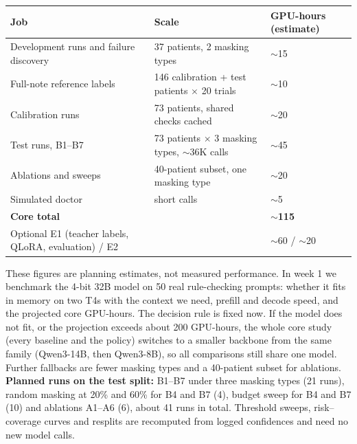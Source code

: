 \documentclass[10pt,a4paper]{article}
\begin{document}
\begin{table}[H]
\centering\footnotesize
\begin{tabularx}{\textwidth}{@{}P{5.2cm}LP{2.0cm}@{}}
\toprule
\textbf{Job} & \textbf{Scale} & \textbf{GPU-hours (estimate)}\\
\midrule
Development runs and failure discovery & 37 patients, 2 masking types & \(\sim\)15\\
Full-note reference labels & 146 calibration + test patients \(\times\) 20 trials & \(\sim\)10\\
Calibration runs & 73 patients, shared checks cached & \(\sim\)20\\
Test runs, B1--B7 & 73 patients \(\times\) 3 masking types, \(\sim\)36K calls & \(\sim\)45\\
Ablations and sweeps & 40-patient subset, one masking type & \(\sim\)20\\
Simulated doctor & short calls & \(\sim\)5\\
\midrule
\textbf{Core total} & & \(\sim\)\textbf{115}\\
Optional E1 (teacher labels, QLoRA, evaluation) / E2 & & \(\sim\)60 / \(\sim\)20\\
\bottomrule
\end{tabularx}
\end{table}
\vspace{-3pt}
These figures are planning estimates, not measured performance. In week 1 we benchmark the 4-bit 32B model on 50 real rule-checking prompts: whether it fits in memory on two T4s with the context we need, prefill and decode speed, and the projected core GPU-hours. The decision rule is fixed now. If the model does not fit, or the projection exceeds about 200 GPU-hours, the whole core study (every baseline and the policy) switches to a smaller backbone from the same family (Qwen3-14B, then Qwen3-8B), so all comparisons still share one model. Further fallbacks are fewer masking types and a 40-patient subset for ablations. \textbf{Planned runs on the test split:} B1--B7 under three masking types (21 runs), random masking at 20\% and 60\% for B4 and B7 (4), budget sweep for B4 and B7 (10) and ablations A1--A6 (6), about 41 runs in total. Threshold sweeps, risk--coverage curves and resplits are recomputed from logged confidences and need no new model calls.

\end{document}
